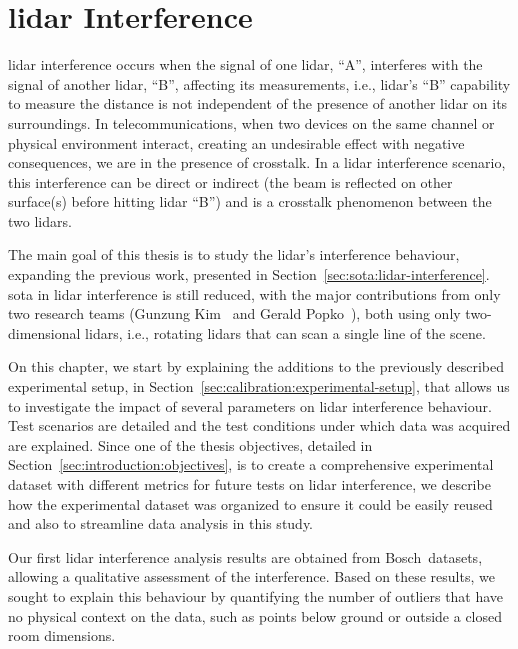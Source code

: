 \chapter{\acs{lidar} Interference}
\label{chapter:lidar-interference}

\ac{lidar} interference occurs when the signal of one \ac{lidar}, ``A'', interferes with the signal of another \ac{lidar}, ``B'', affecting its measurements, i.e., \ac{lidar}'s ``B'' capability to measure the distance is not independent of the presence of another \ac{lidar} on its surroundings. In telecommunications, when two devices on the same channel or physical environment interact, creating an undesirable effect with negative consequences, we are in the presence of crosstalk. In a \ac{lidar} interference scenario, this interference can be direct or indirect (the beam is reflected on other surface(s) before hitting \ac{lidar} ``B'') and is a crosstalk phenomenon between the two \acp{lidar}.

The main goal of this thesis is to study the \ac{lidar}'s interference behaviour, expanding the previous work, presented in Section~\ref{sec:sota:lidar-interference}. \acl{sota} in \ac{lidar} interference is still reduced, with the major contributions from only two research teams (Gunzung Kim\etal~\cite{Kim2015c, Kim2017} and Gerald Popko\etal~\cite{Popko2019a, Popko2019b}), both using only two-dimensional \acp{lidar}, i.e., rotating \acp{lidar} that can scan a single line of the scene.

On this chapter, we start by explaining the additions to the previously described experimental setup, in Section~\ref{sec:calibration:experimental-setup}, that allows us to investigate the impact of several parameters on \ac{lidar} interference behaviour. Test scenarios are detailed and the test conditions under which data was acquired are explained. Since one of the thesis objectives, detailed in Section~\ref{sec:introduction:objectives}, is to create a comprehensive experimental dataset with different metrics for future tests on \ac{lidar} interference, we describe how the experimental dataset was organized to ensure it could be easily reused and also to streamline data analysis in this study.

Our first \ac{lidar} interference analysis results are obtained from Bosch\cp~datasets, allowing a qualitative assessment of the interference. Based on these results, we sought to explain this behaviour by quantifying the number of outliers that have no physical context on the data, such as points below ground or outside a closed room dimensions.

